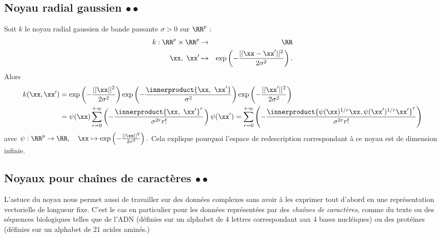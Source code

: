 \subsection{Noyau radial gaussien $\bullet \bullet$}
\label{sec:rbf_kernel}
Soit $k$ le noyau radial gaussien de bande passante $\sigma > 0$ sur $\RR^p$ :
\begin{eqnarray*}
  k: \RR^p \times \RR^p & \rightarrow & \RR \\
  \xx,~\xx^\prime & \mapsto & \exp\left( - \frac{||\xx - \xx^\prime||^2}{2 \sigma^2} \right).
\end{eqnarray*}
Alors
\begin{align*}
  k(\xx, \xx^\prime) & = \exp\left( - \frac{||\xx||^2}{2 \sigma^2} \right)
                 \exp\left( - \frac{\innerproduct{\xx,~\xx^\prime}}{\sigma^2} \right)
                 \exp\left( - \frac{||\xx^\prime||^2}{2 \sigma^2} \right)  \\
               & = \psi(\xx) 
                 \sum_{r=0}^{+ \infty} 
                 \left( - \frac{\innerproduct{\xx,~ \xx^\prime}^r}{\sigma^{2r} r! } \right) \psi(\xx^\prime) 
    = \sum_{r=0}^{+ \infty} 
    \left( - \frac{\innerproduct{\psi(\xx)^{1/r} \xx, \psi(\xx^\prime)^{1/r} \xx^\prime}^r}{\sigma^{2r} r! } \right) 
\end{align*}
avec
$\psi: \RR^p \rightarrow \RR, \quad \xx \mapsto \exp\left( -\frac{||\xx||^2}{2
    \sigma^2} \right).$ Cela explique pourquoi l'espace de redescription
correspondant à ce noyau est de dimension infinie.

\subsection{Noyaux pour chaînes de caractères $\bullet \bullet$}
\label{sec:more_kernels}
L'astuce du noyau nous permet aussi de travailler sur des données complexes
sans avoir à les exprimer tout d'abord en une représentation vectorielle de
longueur fixe. C'est le cas en particulier pour les données représentées par
des {\it chaînes de caractères,} comme du texte ou des séquences biologiques
telles que de l'ADN (définies sur un alphabet de 4 lettres correspondant aux 4
bases nucléiques) ou des protéines (définies sur un alphabet de 21 acides
aminés.)
  
